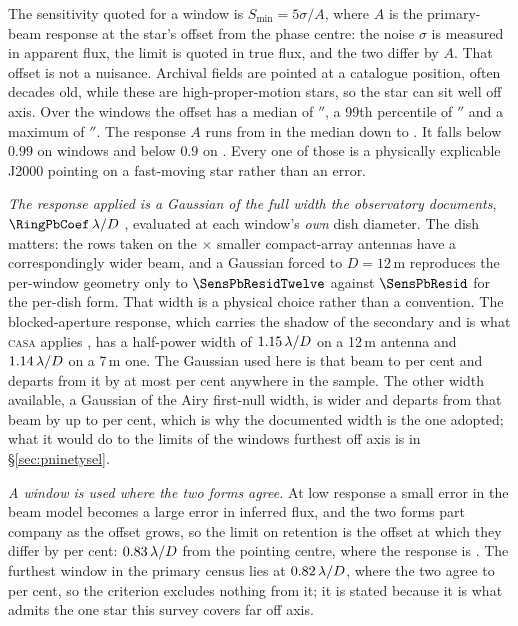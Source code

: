 The sensitivity quoted for a window is $S_{\min}=5\sigma/A$, where $A$ is the
primary-beam response at the star's offset from the phase centre: the noise
$\sigma$ is measured in apparent flux, the limit is quoted in true flux, and
the two differ by $A$. That offset is not a nuisance. Archival fields are
pointed at a catalogue position, often decades old, while these are
high-proper-motion stars, so the star can sit well off axis. Over the
\PbNWin{} windows the offset has a median of \PbOffMed$''$, a 99th
percentile of \PbOffPNN$''$ and a maximum of \BmOffMax$''$. The response $A$
runs from \BmRespMed{} in the median down to \BmRespMin. It falls below $0.99$
on \PbNLowNN{} windows and below $0.9$ on \BmNBelowNine. Every one
of those is a physically explicable J2000 pointing on a
fast-moving star rather than an error.

\emph{The response applied is a Gaussian of the full width the observatory
documents}, $\RingPbCoef\,\lambda/D$ \citep{ALMAHandbook}, evaluated at each
window's \emph{own} dish diameter. The dish matters: the \PbNAcaRow{} rows
taken on the \PbAcaRatio$\times$ smaller compact-array antennas have a
correspondingly wider beam, and a Gaussian forced to $D=12$\,m reproduces the
per-window geometry only to $\SensPbResidTwelve$ against $\SensPbResid$ for
the per-dish form. That width is a physical choice rather than a convention.
The blocked-aperture response, which carries the shadow of the secondary and
is what \textsc{casa} applies \citep{CASA2022}, has a half-power
width of $1.15\,\lambda/D$ on a 12\,m antenna and
$1.14\,\lambda/D$ on a 7\,m one. The Gaussian used here is that
beam to \BmDocAiryPct{} per cent and departs from it by at most
\BmModelMaxPct{} per cent anywhere in the sample. The other width available,
a Gaussian of the Airy first-null width, is wider and departs from that beam
by up to \BmModelMaxNullPct{} per cent, which is why the documented width is
the one adopted; what it would do to the limits of the windows furthest off
axis is in \S\ref{sec:pninetysel}.

\emph{A window is used where the two forms agree.} At low response a small
error in the beam model becomes a large error in inferred flux, and the two
forms part company as the offset grows, so the limit on retention is the
offset at which they differ by \BmFloorTolPct{} per cent:
$0.83\,\lambda/D$ from the pointing centre, where the response is
\BmFloorResp. The furthest window in the primary census lies at
$0.82\,\lambda/D$, where the two agree to \BmCensusWorstPct{} per
cent, so the criterion excludes nothing from it; it is stated because it is
what admits the one star this survey covers far off axis.

